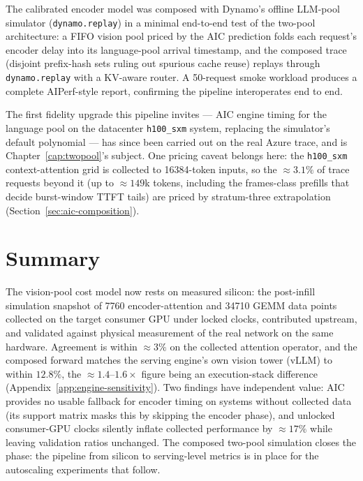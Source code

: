 The calibrated encoder model was composed with Dynamo's offline LLM-pool
simulator (\texttt{dynamo.replay}) in a minimal end-to-end test of the
two-pool architecture: a FIFO vision pool priced by the AIC prediction
folds each request's encoder delay into its language-pool arrival
timestamp, and the composed trace (disjoint prefix-hash sets ruling out
spurious cache reuse) replays through \texttt{dynamo.replay} with a
KV-aware router. A 50-request smoke workload produces a complete
AIPerf-style report, confirming the pipeline interoperates end to end.

The first fidelity upgrade this pipeline invites --- AIC engine timing for
the language pool on the datacenter \texttt{h100\_sxm} system, replacing the
simulator's default polynomial --- has since been carried out on the real
Azure trace, and is Chapter~\ref{cap:twopool}'s subject. One pricing caveat
belongs here: the \texttt{h100\_sxm} context-attention grid is collected to
\num{16384}-token inputs, so the ${\approx}3.1\%$ of trace requests beyond
it (up to ${\approx}149$k tokens, including the frames-class prefills that
decide burst-window TTFT tails) are priced by stratum-three extrapolation
(Section~\ref{sec:aic-composition}).

\section{Summary}

The vision-pool cost model now rests on measured silicon: the
post-infill simulation snapshot of \num{7760}
encoder-attention and \num{34710} GEMM data points collected on the target
consumer GPU under locked clocks, contributed upstream, and validated
against physical measurement of the real network on the same hardware.
Agreement is within ${\approx}3\%$ on the collected attention operator,
and the composed forward matches the serving engine's own vision tower
(vLLM) to within $12.8\%$, the ${\approx}1.4$--$1.6\times$ figure being
an execution-stack difference (Appendix~\ref{app:engine-sensitivity}). Two
findings have independent value: AIC provides no usable fallback for encoder
timing on systems without collected data (its support matrix masks this by
skipping the encoder phase), and unlocked consumer-GPU clocks silently
inflate collected performance by ${\approx}17\%$ while leaving validation
ratios unchanged. The composed two-pool simulation closes the phase: the
pipeline from silicon to serving-level metrics is in place for the
autoscaling experiments that follow.
